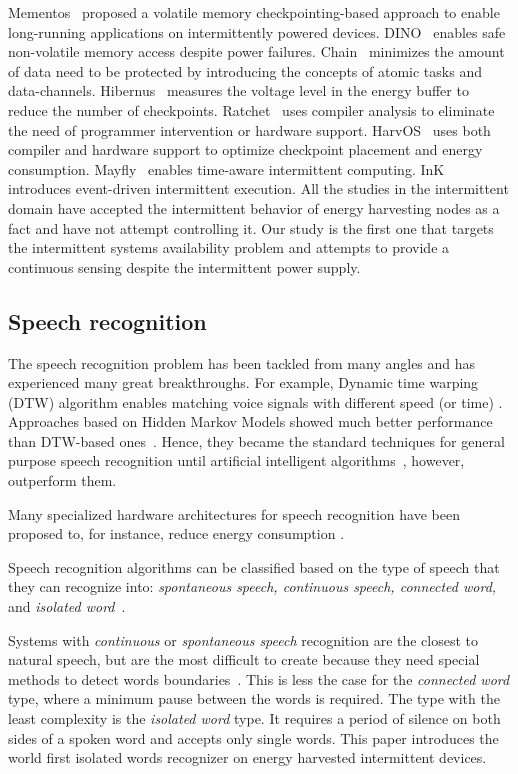Mementos~\cite{mementos} proposed a volatile memory checkpointing-based approach to enable long-running applications on intermittently powered devices. DINO~\cite{dino} enables safe non-volatile memory access despite power failures. Chain~\cite{colin2016chain} minimizes the amount of data need to be protected by introducing the concepts of atomic tasks and data-channels. Hibernus~\cite{balsamo2015hibernus} measures the voltage level in the energy buffer to reduce the number of checkpoints. Ratchet~\cite{woude2016ratchet} uses compiler analysis to eliminate the need of programmer intervention or hardware support. HarvOS~\cite{bhatti2017harvos} uses both compiler and hardware support to optimize checkpoint placement and energy consumption. Mayfly~\cite{hester2017timely} enables time-aware intermittent computing. InK~\cite{yildirim2018ink} introduces event-driven intermittent execution. All the studies in the intermittent domain have accepted the intermittent behavior of energy harvesting nodes as a fact and have not attempt controlling it. Our study is the first one that targets the intermittent systems availability problem and attempts to provide a continuous sensing despite the intermittent power supply.  

\subsection{Speech recognition}
The speech recognition problem has been tackled from many angles and has experienced many great breakthroughs. For example, Dynamic time warping (DTW) algorithm enables matching voice signals with different speed (or time) \cite{}. Approaches based on Hidden Markov Models showed much better performance than DTW-based ones~\cite{jelinek1997statistical}. Hence, they became the standard techniques for general purpose speech recognition until artificial intelligent algorithms~\cite{hinton2012deep}, however, outperform them. 

Many specialized hardware architectures for speech recognition have been proposed to, for instance, reduce energy consumption \cite{price2018low,price20156}. 

Speech recognition algorithms can be classified based on the type of speech that they can recognize into: \textit{spontaneous speech, continuous speech, connected word,} and \textit{isolated word}~\cite{gaikwad2010review}.

Systems with \textit{continuous} or \textit{spontaneous speech} recognition are the closest to natural speech, but are the most difficult to create because they need special methods to detect words boundaries~\cite{gaikwad2010review}. This is less the case for the \textit{connected word} type, where a minimum pause between the words is required.
 The type with the least complexity is the \textit{isolated word} type. It requires a period of silence on both sides of a spoken word and accepts only single words. This paper introduces the world first isolated words recognizer on energy harvested intermittent devices. 

